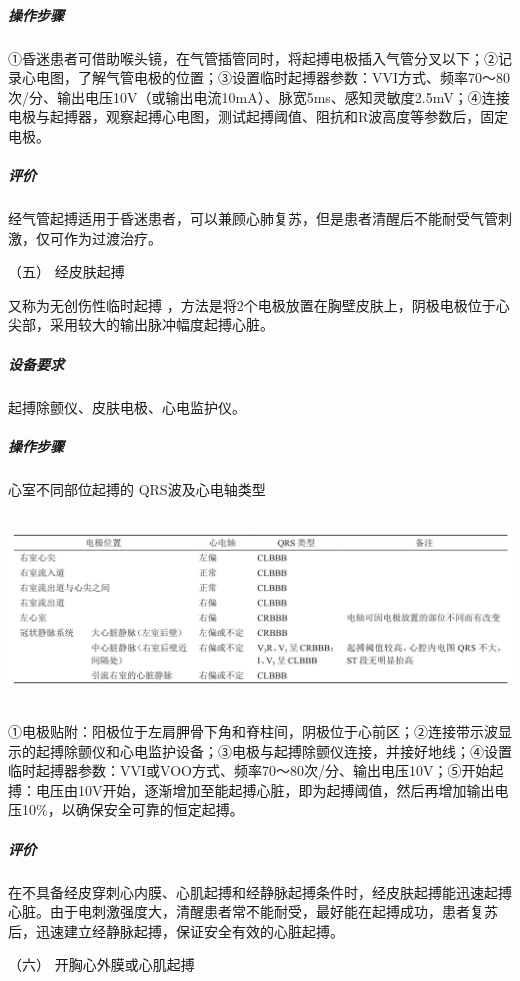 \subparagraph{操作步骤}

①昏迷患者可借助喉头镜，在气管插管同时，将起搏电极插入气管分叉以下；②记录心电图，了解气管电极的位置；③设置临时起搏器参数：VVI方式、频率70～80次/分、输出电压10V（或输出电流10mA）、脉宽5ms、感知灵敏度2.5mV；④连接电极与起搏器，观察起搏心电图，测试起搏阈值、阻抗和R波高度等参数后，固定电极。

\subparagraph{评价}

经气管起搏适用于昏迷患者，可以兼顾心肺复苏，但是患者清醒后不能耐受气管刺激，仅可作为过渡治疗。

\hypertarget{text00375.htmlux5cux23CHP16-5-3-5}{}
（五） 经皮肤起搏

又称为无创伤性临时起搏
，方法是将2个电极放置在胸壁皮肤上，阴极电极位于心尖部，采用较大的输出脉冲幅度起搏心脏。

\subparagraph{设备要求}

起搏除颤仪、皮肤电极、心电监护仪。

\subparagraph{操作步骤}

\begin{table}[htbp]
\centering
\caption{心室不同部位起搏的 QRS波及心电轴类型}
\label{tab138-1}
\includegraphics[width=6.58333in,height=1.97917in]{./images/Image00524.jpg}
\end{table}

①电极贴附：阳极位于左肩胛骨下角和脊柱间，阴极位于心前区；②连接带示波显示的起搏除颤仪和心电监护设备；③电极与起搏除颤仪连接，并接好地线；④设置临时起搏器参数：VVI或VOO方式、频率70～80次/分、输出电压10V；⑤开始起搏：电压由10V开始，逐渐增加至能起搏心脏，即为起搏阈值，然后再增加输出电压10\%，以确保安全可靠的恒定起搏。

\subparagraph{评价}

在不具备经皮穿刺心内膜、心肌起搏和经静脉起搏条件时，经皮肤起搏能迅速起搏心脏。由于电刺激强度大，清醒患者常不能耐受，最好能在起搏成功，患者复苏后，迅速建立经静脉起搏，保证安全有效的心脏起搏。

\hypertarget{text00375.htmlux5cux23CHP16-5-3-6}{}
（六） 开胸心外膜或心肌起搏

